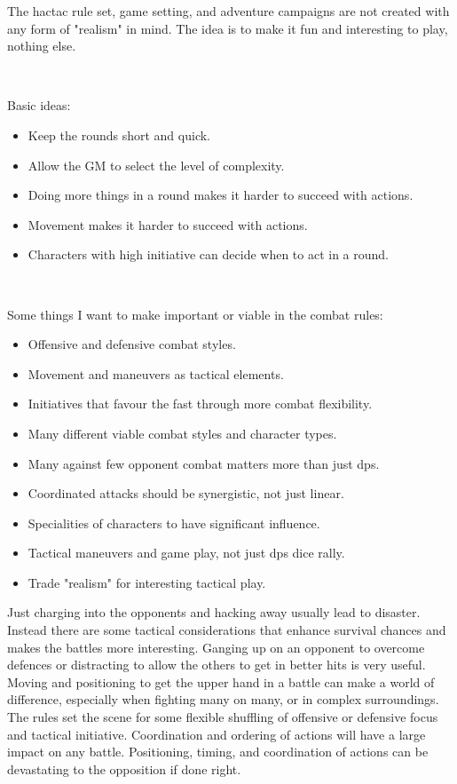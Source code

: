 The hactac rule set, game setting, and adventure campaigns are not created with any form of "realism" in mind. The idea is to make it fun and interesting to play, nothing else.

\

Basic ideas:
\begin{itemize}
    \item Keep the rounds short and quick.
    \item Allow the GM to select the level of complexity.
    \item Doing more things in a round makes it harder to succeed with actions.
    \item Movement makes it harder to succeed with actions.
    \item Characters with high initiative can decide when to act in a round.
\end{itemize}

\

Some things I want to make important or viable in the combat rules:
\begin{itemize}
    \item Offensive and defensive combat styles.
    \item Movement and maneuvers as tactical elements.
    \item Initiatives that favour the fast through more combat flexibility.
    \item Many different viable combat styles and character types.
    \item Many against few opponent combat matters more than just dps.
    \item Coordinated attacks should be synergistic, not just linear.
    \item Specialities of characters to have significant influence.
    \item Tactical maneuvers and game play, not just dps dice rally.
    \item Trade "realism" for interesting tactical play.
\end{itemize}

Just charging into the opponents and hacking away usually lead to disaster. Instead there are some tactical considerations that enhance survival chances and makes the battles more interesting. Ganging up on an opponent to overcome defences or distracting to allow the others to get in better hits is very useful. Moving and positioning to get the upper hand in a battle can make a world of difference, especially when fighting many on many, or in complex surroundings. The rules set the scene for some flexible shuffling of offensive or defensive focus and tactical initiative. Coordination and ordering of actions will have a large impact on any battle. Positioning, timing, and coordination of actions can be devastating to the opposition if done right.

